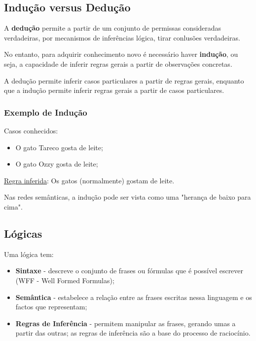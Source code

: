 \documentclass{article}
\begin{document}
\pagebreak

\subsection{Indução versus Dedução}

A \textbf{dedução} permite a partir de um conjunto de permissas consideradas verdadeiras, por
mecanismos de inferências lógica, tirar conlusões verdadeiras.

No entanto, para adquirir conhecimento novo é necessário haver \textbf{indução}, ou seja, a
capacidade de inferir regras gerais a partir de observações concretas.

A dedução permite inferir casos particulares a partir de regras gerais, enquanto que
a indução permite inferir regras gerais a partir de casos particulares.

\subsubsection{Exemplo de Indução}

\begin{flushleft}
  Casos conhecidos:
  \begin{itemize}
    \item O gato Tareco gosta de leite;
    \item O gato Ozzy gosta de leite;
  \end{itemize}

  \uline{Regra inferida}: Os gatos (normalmente) gostam de leite.

  Nas redes semânticas, a indução pode ser vista como uma "herança de baixo para cima".
\end{flushleft}

\subsection{Lógicas}

Uma lógica tem:
\begin{itemize}
  \item \textbf{Sintaxe} - descreve o conjunto de frases ou fórmulas que é possível
  escrever (WFF - Well Formed Formulas);
  \item \textbf{Semântica} - estabelece a relação entre as frases escritas nessa
  linguagem e os factos que representam;
  \item \textbf{Regras de Inferência} - permitem manipular as frases, gerando
  umas a partir das outras; as regras de inferência são a base do
  processo de raciocínio.
\end{itemize}
\end{document}
